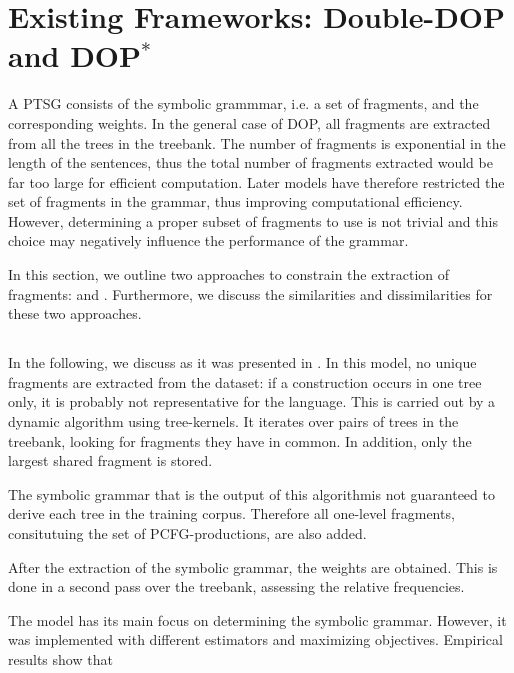 
\section{Existing Frameworks: Double-DOP and DOP$^*$}

A PTSG consists of the symbolic grammmar, i.e. a set of fragments, and the corresponding weights. In the general case of DOP, all fragments are extracted from all the trees in the treebank. The number of fragments is exponential in the length of the sentences, thus the total number of fragments extracted would be far too large for efficient computation. Later models have therefore restricted the set of fragments in the grammar, thus improving computational efficiency. However, determining a proper subset of fragments to use is not trivial and this choice may negatively influence the performance of the grammar.


In this section, we outline two approaches to constrain the extraction of fragments: \ddop and \dops. Furthermore, we discuss the similarities and dissimilarities for these two approaches. 

\subsection{\ddop}
In the following, we discuss \ddop{} as it was presented in \cite{sangati2011}. In this model, no unique fragments are extracted from the dataset: if a construction occurs in one tree only, it is probably not representative for the language. This is carried out by a dynamic algorithm using tree-kernels. It iterates over pairs of trees in the treebank, looking for fragments they have in common. In addition, only the largest shared fragment is stored. 

The symbolic grammar that is the output of this algorithmis not guaranteed to derive each tree in the training corpus. Therefore all one-level fragments, consitutuing the set of PCFG-productions, are also added.

After the extraction of the symbolic grammar, the weights are obtained. This is done in a second pass over the treebank, assessing the relative frequencies. 

The \ddop model has its main focus on determining the symbolic grammar. However, it was implemented with different estimators and maximizing objectives. Empirical results show that %

